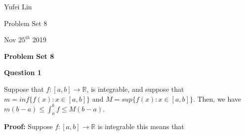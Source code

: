 \documentclass[a4paper,12pt]{report}
\begin{document}
\noindent
Yufei Lin

\noindent
Problem Set 8

\noindent
Nov \(25^{th}\) 2019

\begin{center}
\textbf{Problem Set 8}
\end{center}

\noindent
\textbf{Question 1}

\noindent
Suppose that $f:[a,b]\rightarrow\mathbb{R}$, is integrable, and suppose that $m=inf\{f(x):x\in [a,b]\}$ and $M=sup\{f(x):x\in [a,b]\}$. Then, we have $m(b-a)\leq \int_{a}^{b}f\leq M(b-a)$.

\noindent
\textbf{Proof: }
Suppose $f:[a,b]\rightarrow\mathbb{R}$ is integrable this means that 
\end{document}

